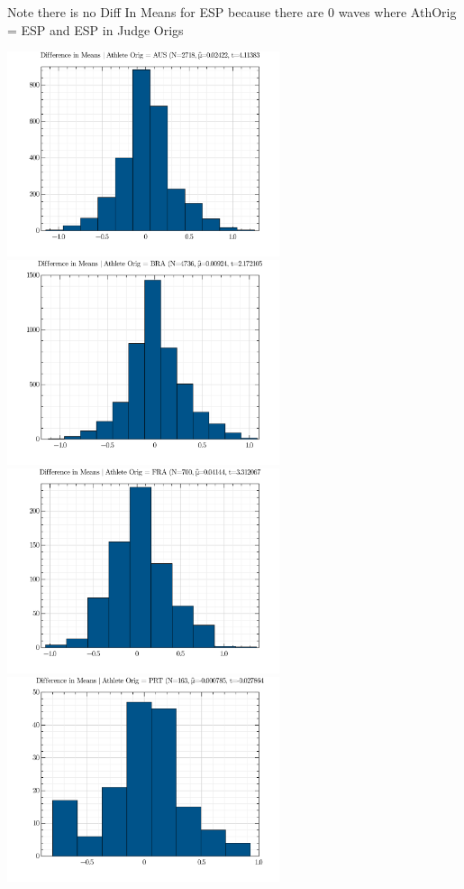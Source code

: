 \documentclass{article}
\theoremstyle{definition}
\begin{document}
Note there is no Diff In Means for ESP because there are 0 waves where AthOrig = ESP and ESP in Judge Origs

\includegraphics[width=8cm]{./src/visuals/DistOfDiffInMeansForAUS.png}
\includegraphics[width=8cm]{./src/visuals/DistOfDiffInMeansForBRA.png}
\includegraphics[width=8cm]{./src/visuals/DistOfDiffInMeansForFRA.png}
\includegraphics[width=8cm]{./src/visuals/DistOfDiffInMeansForPRT.png}
\end{document}
